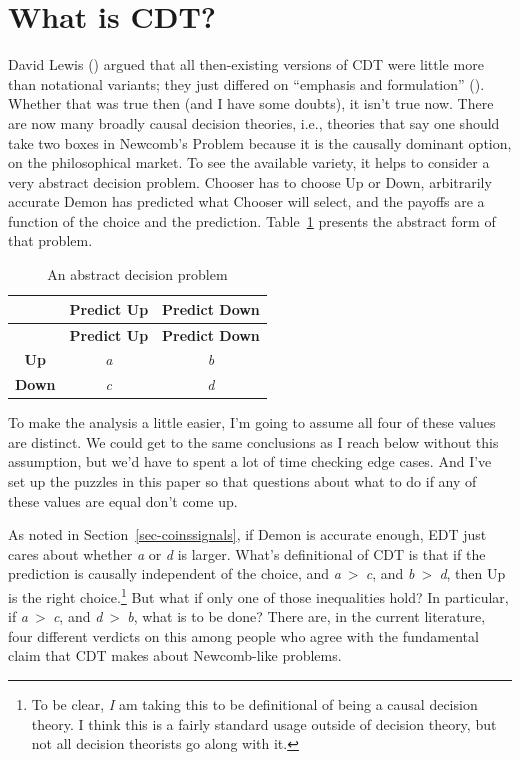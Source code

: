 \documentclass[
  11pt,
  letterpaper,
  DIV=11,
  numbers=noendperiod,
  twoside]{scrartcl}
\begin{document}
\section{What is CDT?}\label{sec-cdt-definition}

David Lewis () argued that all
then-existing versions of CDT were little more than notational variants;
they just differed on ``emphasis and formulation''
(). Whether that was true then
(and I have some doubts), it isn't true now. There are now many broadly
causal decision theories, i.e., theories that say one should take two
boxes in Newcomb's Problem because it is the causally dominant option,
on the philosophical market. To see the available variety, it helps to
consider a very abstract decision problem. Chooser has to choose Up or
Down, arbitrarily accurate Demon has predicted what Chooser will select,
and the payoffs are a function of the choice and the prediction.
Table~\ref{tbl-abstract} presents the abstract form of that problem.

\begin{longtable}[]{@{}ccc@{}}
\caption{An abstract decision
problem}\label{tbl-abstract}\tabularnewline
\toprule\noalign{}
& \textbf{Predict Up} & \textbf{Predict Down} \\
\midrule\noalign{}
\endfirsthead
\toprule\noalign{}
& \textbf{Predict Up} & \textbf{Predict Down} \\
\midrule\noalign{}
\endhead
\bottomrule\noalign{}
\endlastfoot
\textbf{Up} & \emph{a} & \emph{b} \\
\textbf{Down} & \emph{c} & \emph{d} \\
\end{longtable}

To make the analysis a little easier, I'm going to assume all four of
these values are distinct. We could get to the same conclusions as I
reach below without this assumption, but we'd have to spent a lot of
time checking edge cases. And I've set up the puzzles in this paper so
that questions about what to do if any of these values are equal don't
come up.

As noted in Section~\ref{sec-coinssignals}, if Demon is accurate enough,
EDT just cares about whether \emph{a} or \emph{d} is larger. What's
definitional of CDT is that if the prediction is causally independent of
the choice, and \emph{a}~\textgreater~\emph{c}, and
\emph{b}~\textgreater~\emph{d}, then Up is the right choice.\footnote{To
  be clear, \emph{I} am taking this to be definitional of being a causal
  decision theory. I think this is a fairly standard usage outside of
  decision theory, but not all decision theorists go along with it.} But
what if only one of those inequalities hold? In particular, if
\emph{a}~\textgreater~\emph{c}, and \emph{d}~\textgreater~\emph{b}, what
is to be done? There are, in the current literature, four different
verdicts on this among people who agree with the fundamental claim that
CDT makes about Newcomb-like problems.
\end{document}
